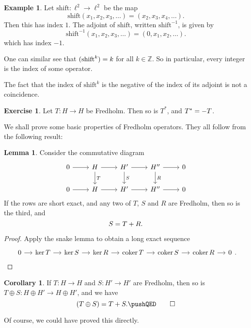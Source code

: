 \documentclass{shortart}
\theoremstyle{definition}
\newtheorem*{eg}{Example}
\newtheorem*{ex}{Exercise}
\newtheorem*{cor}{Corollary}
\newtheorem*{lemma}{Lemma}
\newcommand\Z{\mathbb{Z}}
\let\index\relax
\DeclareMathOperator{\coker}{coker}
\DeclareMathOperator{\index}{idx}
\begin{document}
\begin{eg}
  Let $\mathrm{shift}: \ell^2 \to \ell^2$ be the map
  \[
    \mathrm{shift}(x_1, x_2, x_3, \dots) = (x_2, x_3, x_4, \dots).
  \]
  Then this has index $1$. The adjoint of $\mathrm{shift}$, written $\mathrm{shift}^{-1}$, is given by
  \[
    \mathrm{shift}^{-1}(x_1, x_2, x_3, \dots) = (0, x_1, x_2, \dots).
  \]
  which has index $-1$.

  One can similar see that $\index (\mathrm{shift}^k) = k$ for all $k \in \Z$. So in particular, every integer is the index of some operator.
\end{eg}

The fact that the index of $\mathrm{shift}^k$ is the negative of the index of its adjoint is not a coincidence.

\begin{ex}
  Let $T: H \to H$ be Fredholm. Then so is $T^*$, and $\index T^* = - \index T$.
\end{ex}

We shall prove some basic properties of Fredholm operators. They all follow from the following result:

\begin{lemma}
  Consider the commutative diagram
  \[
    \begin{tikzcd}
      0 \ar[r] & H \ar[r] \ar[d, "T"] & H' \ar[r] \ar[d, "S"]& H'' \ar[r] \ar[d, "R"] & 0\\
      0 \ar[r] & H \ar[r] & H' \ar[r] & H'' \ar[r] & 0
    \end{tikzcd}
  \]
  If the rows are short exact, and any two of $T$, $S$ and $R$ are Fredholm, then so is the third, and
  \[
    \index S = \index T + \index R.
  \]
\end{lemma}

\begin{proof}
  Apply the snake lemma to obtain a long exact sequence
  \[
    \begin{tikzcd}[column sep=small]
      0 \ar[r] & \ker T \ar[r] & \ker S \ar[r] & \ker R \ar[r] & \coker T \ar[r] & \coker S \ar[r] & \coker R \ar[r] & 0
    \end{tikzcd}.\qedhere
  \]
\end{proof}

\begin{cor}
  If $T: H \to H$ and $S: H' \to H'$ are Fredholm, then so is $T \oplus S: H \oplus H' \to H \oplus H'$, and we have
  \[
    \index (T \oplus S) = \index T + \index S.\fakeqed
  \]
\end{cor}
Of course, we could have proved this directly.
\end{document}
